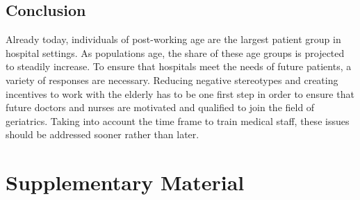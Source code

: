 \subsection{Conclusion}

Already today, individuals of post-working age are the largest patient group 
in hospital settings. As populations age, the share of these age groups is 
projected to steadily increase. To ensure that hospitals meet the needs of 
future patients, a variety of responses are necessary. Reducing negative 
stereotypes and creating incentives to work with the elderly has to be one 
first step in order to ensure that future doctors and nurses are motivated 
and qualified to join the field of geriatrics. Taking into account the time 
frame to train medical staff, these issues should be addressed sooner rather 
than later. 




\newpage


\section{Supplementary Material}


\newpage


